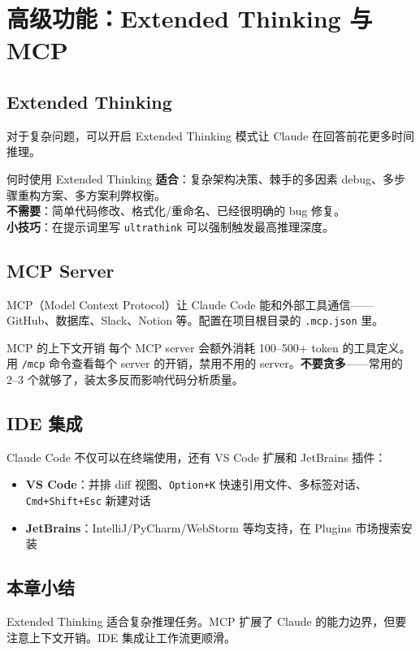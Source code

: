 \section{高级功能：Extended Thinking 与 MCP}

\subsection{Extended Thinking}

对于复杂问题，可以开启 Extended Thinking 模式让 Claude 在回答前花更多时间推理。

\begin{importantbox}{何时使用 Extended Thinking}
\textbf{适合}：复杂架构决策、棘手的多因素 debug、多步骤重构方案、多方案利弊权衡。\\
\textbf{不需要}：简单代码修改、格式化/重命名、已经很明确的 bug 修复。\\
\textbf{小技巧}：在提示词里写 \texttt{ultrathink} 可以强制触发最高推理深度。
\end{importantbox}

\subsection{MCP Server}

MCP（Model Context Protocol）让 Claude Code 能和外部工具通信——GitHub、数据库、Slack、Notion 等。配置在项目根目录的 \texttt{.mcp.json} 里。

\begin{warningbox}{MCP 的上下文开销}
每个 MCP server 会额外消耗 100--500+ token 的工具定义。用 \texttt{/mcp} 命令查看每个 server 的开销，禁用不用的 server。\textbf{不要贪多}——常用的 2--3 个就够了，装太多反而影响代码分析质量。
\end{warningbox}

\subsection{IDE 集成}

Claude Code 不仅可以在终端使用，还有 VS Code 扩展和 JetBrains 插件：

\begin{itemize}[leftmargin=1.5em]
  \item \textbf{VS Code}：并排 diff 视图、\texttt{Option+K} 快速引用文件、多标签对话、\texttt{Cmd+Shift+Esc} 新建对话
  \item \textbf{JetBrains}：IntelliJ/PyCharm/WebStorm 等均支持，在 Plugins 市场搜索安装
\end{itemize}

\subsection{本章小结}

Extended Thinking 适合复杂推理任务。MCP 扩展了 Claude 的能力边界，但要注意上下文开销。IDE 集成让工作流更顺滑。

